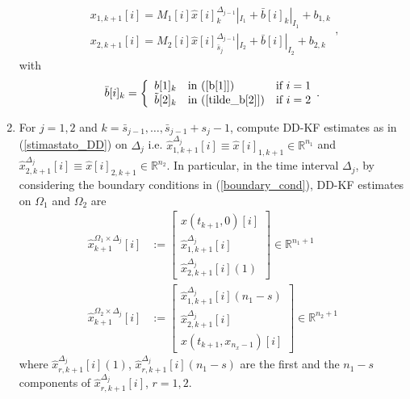 \begin{enumerate}
\begin{equation}
\begin{array}{ll}
x_{1,k+1}[i]=M_{1}[i]\widehat{x}[i]_{k}^{\Delta_{j-1}}|_{I_{1}}+\bar{b}[i]_{k}|_{I_{1}}+b_{1,k}\\
x_{2,k+1}[i]=M_{2}[i]\widehat{x}[i]_{\bar{s}_{j}}^{\Delta_{j-1}}|_{I_{2}}+\bar{b}[i]|_{I_{2}}+b_{2,k}
\end{array},
 \end{equation}
 with 
 \begin{equation}
 \bar{b}[i]_{k}=\left\{\begin{array}{lll}
 b[1]_{k} & \textrm{in (\ref{b[1]})} & \textrm{if $i=1$}\\
  \tilde{b}[2]_{k} &\textrm{in (\ref{tilde_b[2]})} & \textrm{if $i=2$} 
 \end{array}.\right.
 \end{equation}
\item For $j=1,2$ and $k=\bar{s}_{j-1},\ldots,\bar{s}_{j-1}+s_{j}-1$, compute DD-KF estimates as in (\ref{stimastato_DD}) on $\Delta_{j}$ i.e. $ \widehat{x}_{1,k+1}^{\Delta_{j}}[i] \equiv \widehat{x}[i]_{1,k+1}\in \mathbb{R}^{n_{1}}$ and $\widehat{x}_{2,k+1}^{\Delta_{j}}[i] \equiv \widehat{x}[i]_{2,k+1}\in \mathbb{R}^{n_{2}}$. In particular, in the time interval $\Delta_{j}$, by considering the boundary conditions in (\ref{boundary_cond}), DD-KF estimates on $\Omega_{1}$ and $\Omega_{2}$ are 
\begin{equation}
\begin{array}{ll}
\widehat{x}_{k+1}^{\Omega_{1}\times \Delta_{j}}[i] &:=\left[\begin{array}{ll}
{x}(t_{k+1},0)[i]\\
\widehat{x}_{1,k+1}^{\Delta_{j}}[i]\\
\widehat{x}_{2,k+1}^{\Delta_{j}}[i](1)
\end{array}\right]\in \mathbb{R}^{n_{1}+1} \\
\widehat{x}_{k+1}^{\Omega_{2}\times \Delta_{j}}[i] &:=\left[\begin{array}{ll}
\widehat{x}_{1,k+1}^{\Delta_{j}}[i](n_{1}-s)\\
\widehat{x}_{2,k+1}^{\Delta_{j}}[i]\\
{x}(t_{k+1},x_{n_{x}-1})[i]
\end{array}\right]\in \mathbb{R}^{n_{2}+1} 
\end{array}
\end{equation}
where $\widehat{x}_{r,k+1}^{\Delta_{j}}[i](1)$, $\widehat{x}_{r,k+1}^{\Delta_{j}}[i]( n_{1}-s)$ are the first and the $n_{1}-s$ components of $\widehat{x}_{r,k+1}^{\Delta_{j}}[i]$, $r=1,2$.

\end{enumerate}
